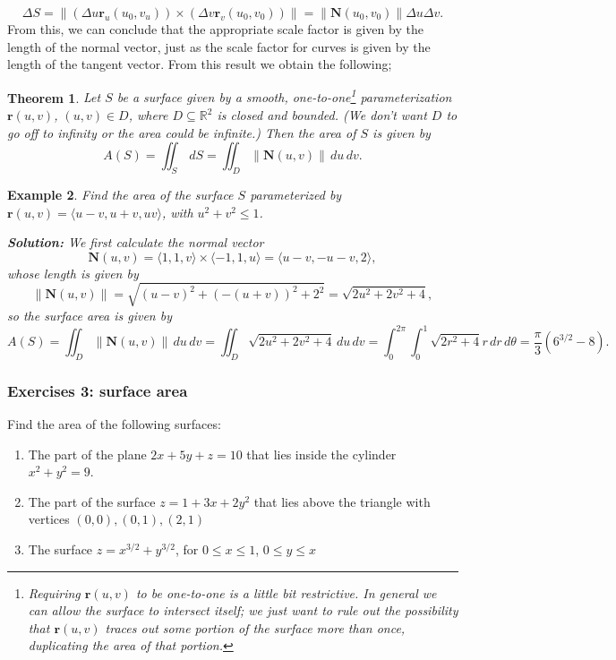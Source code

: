 \documentclass[12pt,letterpaper]{article}
\newtheorem{theorem}{Theorem}
\newtheorem{eg}[theorem]{Example}
\newenvironment{example}{\begin{eg}\rm}{\end{eg}}
\newcommand{\R}{\mathbb{R}}
\renewcommand{\r}{\mathbf{r}}
\newcommand{\N}{\mathbf{N}}
\newcommand{\len}[1]{\left\lVert #1\right\rVert}
\begin{document}
\[
 \Delta S = \len{(\Delta u\r_u(u_0,v_u))\times (\Delta v\r_v(u_0,v_0))} = \len{\N(u_0,v_0)}\Delta u\Delta v.
\]
From this, we can conclude that the appropriate scale factor is given by the length of the normal vector, just as the scale factor for curves is given by the length of the tangent vector. From this result we obtain the following;
\begin{theorem}
 Let $S$ be a surface given by a smooth, one-to-one\footnote{Requiring $\r(u,v)$ to be one-to-one is a little bit restrictive. In general we can allow the surface to intersect itself; we just want to rule out the possibility that $\r(u,v)$ traces out some portion of the surface more than once, duplicating the area of that portion.} parameterization $\r(u,v)$, $(u,v)\in D$, where $D\subseteq\R^2$ is closed and bounded. (We don't want $D$ to go off to infinity or the area could be infinite.) Then the area of $S$ is given by
\[
 A(S) = \iint_S \,dS = \iint_D\len{\N(u,v)}\,du\,dv.
\]
\end{theorem}
\begin{example}
 Find the area of the surface $S$ parameterized by $\r(u,v) = \langle u-v, u+v, uv\rangle$, with $u^2+v^2\leq 1$.

\textbf{Solution:} We first calculate the normal vector
\[
 \N(u,v) = \langle 1,1,v\rangle\times\langle-1, 1,u\rangle = \langle u-v, -u-v, 2\rangle,
\]
whose length is given by
\[
 \len{\N(u,v)} = \sqrt{(u-v)^2+(-(u+v))^2+2^2} = \sqrt{2u^2+2v^2+4},
\]
so the surface area is given by 
\[
 A(S) = \iint_D \len{\N(u,v)}\,du\,dv = \iint_D \sqrt{2u^2+2v^2+4}\,du\,dv = \int_0^{2\pi}\int_0^1 \sqrt{2r^2+4}r\,dr\,d\theta = \frac{\pi}{3}(6^{3/2}-8).
\]
\end{example}

\subsubsection{Exercises 3: surface area}
Find the area of the following surfaces:
\begin{enumerate}
 \item The part of the plane $2x+5y+z=10$ that lies inside the cylinder $x^2+y^2=9$.
 \item The part of the surface $z=1+3x+2y^2$ that lies above the triangle with vertices $(0,0), (0,1), (2,1)$
 \item The surface $z=x^{3/2}+y^{3/2}$, for $0\leq x\leq 1$, $0\leq y\leq x$
\end{enumerate}
\end{document}
